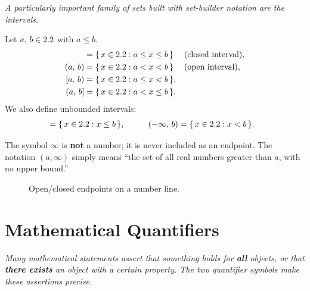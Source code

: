 \textit{A particularly important family of sets built with set-builder notation are the intervals.}

\begin{definition}[Intervals]
\label{def:1-6}
Let $a,\,b \in 2.2$ with $a \le b$.
\begin{align*}
  [a,\,b] &= \{\, x \in \R : a \le x \le b \,\}  &&\text{(closed interval)},\\
  (a,\,b) &= \{\, x \in \R : a < x < b \,\}       &&\text{(open interval)},\\
  [a,\,b) &= \{\, x \in \R : a \le x < b \,\},     &&\\
  (a,\,b] &= \{\, x \in \R : a < x \le b \,\}.     &&
\end{align*}
We also define unbounded intervals:
\begin{align*}
  [a,\,\infty) &= \{\, x \in \R : x \ge a \,\}, &\qquad
  (a,\,\infty) &= \{\, x \in \R : x > a \,\},\\
  (-\infty,\,b] &= \{\, x \in \R : x \le b \,\}, &\qquad
  (-\infty,\,b) &= \{\, x \in \R : x < b \,\}.
\end{align*}
\end{definition}

\begin{remark}
The symbol $\infty$ is \textbf{not} a number; it is never included as an endpoint.  The notation $(a,\infty)$ simply means ``the set of all real numbers greater than $a$, with no upper bound.''
\end{remark}

\begin{figure}[ht]
  \centering
  
  \caption{Open/closed endpoints on a number line.}
  \label{fig:interval-open-closed}
\end{figure}

\section{Mathematical Quantifiers}
\label{sec:1.3}

\textit{Many mathematical statements assert that something holds for \textbf{all} objects, or that \textbf{there exists} an object with a certain property.  The two quantifier symbols make these assertions precise.}

